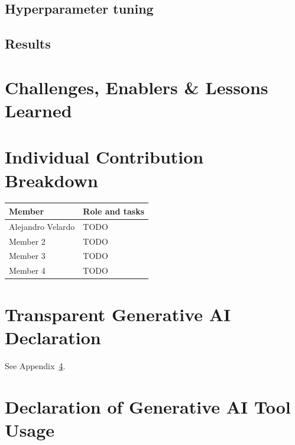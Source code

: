 \documentclass[11pt,a4paper]{article}
\begin{document}
\subsection{Hyperparameter tuning}
\subsection{Results}             %

\section{Challenges, Enablers \& Lessons Learned}

\section{Individual Contribution Breakdown}
\begin{tabular}{@{}lp{10cm}@{}}
\toprule
Member & Role and tasks \\ \midrule
Alejandro Velardo & TODO \\
Member 2 & TODO \\
Member 3 & TODO \\
Member 4 & TODO \\ \bottomrule
\end{tabular}

\section{Transparent Generative AI Declaration}
See Appendix~\ref{app:ai}.

\appendix
\section{Declaration of Generative AI Tool Usage}\label{app:ai}
\end{document}
